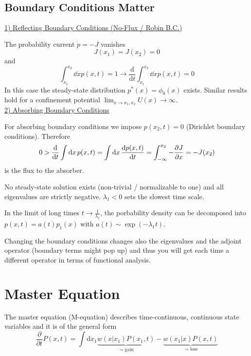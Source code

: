 \documentclass{notebook}
\begin{document}
\subsection*{Boundary Conditions Matter}

\underline{1) Reflecting Boundary Conditions (No-Flux / Robin B.C.)}

The probability current $\dot{p} = -J$ vanishes
%
\begin{equation}
J(x_1) = J(x_2) = 0
\end{equation}
%
and
%
\begin{equation}
\int_{x_1}^{x_2} \dd{x} p(x,t) = 1 \rightarrow
\frac{\mathrm{d}}{\mathrm{d}t} \int_{x_1}^{x_2} \dd{x} p(x,t) = 0
\end{equation}
%
In this case the steady-state distribution $p^*(x) = \phi_0(x)$ exists. Similar results hold for a confinement potential $\lim_{x \to x_1, x_2} U(x) \to \infty$. \\

\underline{2) Absorbing Boundary Conditions}

For absorbing boundary conditions we impose $p(x_2,t) = 0$ (Dirichlet boundary conditions). Therefore
%
\begin{equation}
0 > \dv{t} \int \dd{x} p(x,t) = \int \dd{x} \dv{p(x,t)}{t} = \int_{-\infty}^{x_2} -\pdv{J}{x} = -J(x_2)
\end{equation}
%
is the flux to the absorber. 

No steady-state solution exists (non-trivial / normalizable to one) and all eigenvalues are strictly negative. $\lambda_1 < 0$ sets the slowest time scale.

In the limit of long times $t \to \frac{1}{\lambda_1}$, the porbability density can be decomposed into $p(x,t) = a(t) p_1(x)$ with $a(t) \sim \exp(-\lambda_1 t)$. 

\begin{caveat}
	Changing the boundary conditions changes also the eigenvalues and the adjoint operator (boundary terms might pop up) and thus you will get each time a different operator in terms of functional analysis. 
\end{caveat}


\section{Master Equation}

The master equation (M-equation) describes time-continuous, continuous state variables and it is of the general form
%
\begin{equation}
	\frac{\partial}{\partial t} P(x,t) = \int \mathrm{d}x_1 \underbrace{w(x|x_1) P(x_1,t)}_{= \mathrm{gain}} - \underbrace{w(x_1|x) P(x,t)}_{= \mathrm{loss}}
\end{equation}
%
\end{document}
